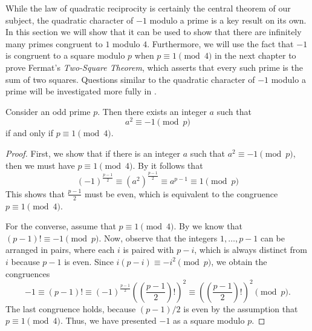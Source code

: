 While the law of quadratic reciprocity is certainly the central theorem of our subject, the quadratic character of $-1$ modulo a prime is a key result on its own. In this section we will show that it can be used to show that there are infinitely many primes congruent to $1$ modulo $4$. Furthermore, we will use the fact that $-1$ is congruent to a square modulo $p$ when $p\equiv 1\pmod{4}$ in the next chapter to prove Fermat's \emph{Two-Square Theorem}, which asserts that every such prime is the sum of two squares. Questions similar to the quadratic character of $-1$ modulo a prime will be investigated more fully in .

\begin{theorem}\label{theorem:quadratic-character-neg-1}
  Consider an odd prime $p$. Then there exists an integer $a$ such that
  \begin{equation*}
    a^2\equiv-1\pmod{p}
  \end{equation*}
  if and only if $p\equiv 1\pmod{4}$.
\end{theorem}

\begin{proof}
  First, we show that if there is an integer $a$ such that $a^2\equiv-1\pmod{p}$, then we must have $p\equiv 1\pmod{4}$. By  it follows that
  \begin{equation*}
    (-1)^{\frac{p-1}{2}}\equiv (a^2)^{\frac{p-1}{2}} \equiv a^{p-1}\equiv 1\pmod{p}
  \end{equation*}
  This shows that $\frac{p-1}{2}$ must be even, which is equivalent to the congruence $p\equiv 1\pmod{4}$.
  
  For the converse, assume that $p\equiv 1\pmod{4}$. By  we know that $(p-1)!\equiv -1\pmod{p}$. Now, observe that the integers $1,\ldots,p-1$ can be arranged in pairs, where each $i$ is paired with $p-i$, which is always distinct from $i$ because $p-1$ is even. Since $i(p-i)\equiv -i^2\pmod{p}$, we obtain the congruences
  \begin{equation*}
    -1\equiv(p-1)!\equiv (-1)^{\frac{p-1}{2}}\left(\left(\frac{p-1}{2}\right)!\right)^2\equiv\left(\left(\frac{p-1}{2}\right)!\right)^2\pmod{p}.
  \end{equation*}
  The last congruence holds, because $(p-1)/2$ is even by the assumption that $p\equiv 1\pmod{4}$. Thus, we have presented $-1$ as a square modulo $p$.
\end{proof}

